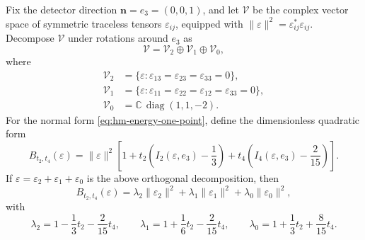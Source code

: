 \begin{lemma}
\label{lem:hm-helicity-spectral-diagonalization}
Fix the detector direction \(\mathbf n=e_3=(0,0,1)\), and let
\(\mathcal V\) be the complex vector space of symmetric traceless tensors
\(\varepsilon_{ij}\), equipped with
\(\|\varepsilon\|^2=\varepsilon^*_{ij}\varepsilon_{ij}\).  Decompose
\(\mathcal V\) under rotations around \(e_3\) as
\[
  \mathcal V=\mathcal V_2\oplus\mathcal V_1\oplus\mathcal V_0,
\]
where
\[
\begin{aligned}
  \mathcal V_2
  &=
  \{\varepsilon:\varepsilon_{13}=\varepsilon_{23}=\varepsilon_{33}=0\},\\
  \mathcal V_1
  &=
  \{\varepsilon:\varepsilon_{11}=\varepsilon_{22}
  =\varepsilon_{12}=\varepsilon_{33}=0\},\\
  \mathcal V_0
  &=
  \mathbb C\,\operatorname{diag}(1,1,-2).
\end{aligned}
\]
For the normal form \eqref{eq:hm-energy-one-point}, define the dimensionless
quadratic form
\[
  B_{t_2,t_4}(\varepsilon)
  =
  \|\varepsilon\|^2
  \left[
    1
    +t_2\left(I_2(\varepsilon,e_3)-\frac13\right)
    +t_4\left(I_4(\varepsilon,e_3)-\frac{2}{15}\right)
  \right].
\]
If
\(\varepsilon=\varepsilon_2+\varepsilon_1+\varepsilon_0\) is the above
orthogonal decomposition, then
\begin{equation}
  B_{t_2,t_4}(\varepsilon)
  =
  \lambda_2\|\varepsilon_2\|^2
  +\lambda_1\|\varepsilon_1\|^2
  +\lambda_0\|\varepsilon_0\|^2,
  \label{eq:hm-helicity-spectral-decomposition}
\end{equation}
with
\begin{equation}
  \lambda_2=1-\frac13t_2-\frac{2}{15}t_4,\qquad
  \lambda_1=1+\frac16t_2-\frac{2}{15}t_4,\qquad
  \lambda_0=1+\frac13t_2+\frac{8}{15}t_4 .
  \label{eq:hm-helicity-eigenvalues}
\end{equation}
\end{lemma}

